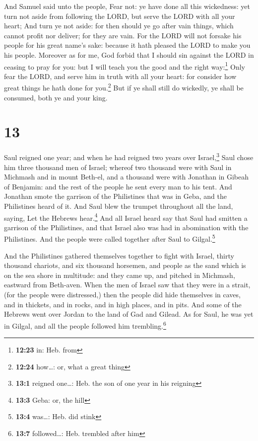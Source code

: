  And Samuel said unto the people, Fear not: ye have done
all this wickedness: yet turn not aside from following the LORD, but
serve the LORD with all your heart;  And turn ye not
aside: for then should ye go after vain things, which cannot profit nor
deliver; for they are vain.  For the LORD will not
forsake his people for his great name's sake: because it hath pleased
the LORD to make you his people.  Moreover as for me, God
forbid that I should sin against the LORD in ceasing to pray for you:
but I will teach you the good and the right way:\footnote{\textbf{12:23}
  in: Heb. from}  Only fear the LORD, and serve him in
truth with all your heart: for consider how great things he hath done
for you.\footnote{\textbf{12:24} how\ldots: or, what a great thing}
 But if ye shall still do wickedly, ye shall be consumed,
both ye and your king.

\hypertarget{section-12}{%
\section{13}\label{section-12}}

 Saul reigned one year; and when he had reigned two years
over Israel,\footnote{\textbf{13:1} reigned one\ldots: Heb. the son of
  one year in his reigning}  Saul chose him three thousand
men of Israel; whereof two thousand were with Saul in Michmash and in
mount Beth-el, and a thousand were with Jonathan in Gibeah of Benjamin:
and the rest of the people he sent every man to his tent. 
And Jonathan smote the garrison of the Philistines that was in Geba, and
the Philistines heard of it. And Saul blew the trumpet throughout all
the land, saying, Let the Hebrews hear.\footnote{\textbf{13:3} Geba: or,
  the hill}  And all Israel heard say that Saul had
smitten a garrison of the Philistines, and that Israel also was had in
abomination with the Philistines. And the people were called together
after Saul to Gilgal.\footnote{\textbf{13:4} was\ldots: Heb. did stink}

 And the Philistines gathered themselves together to fight
with Israel, thirty thousand chariots, and six thousand horsemen, and
people as the sand which is on the sea shore in multitude: and they came
up, and pitched in Michmash, eastward from Beth-aven. 
When the men of Israel saw that they were in a strait, (for the people
were distressed,) then the people did hide themselves in caves, and in
thickets, and in rocks, and in high places, and in pits. 
And some of the Hebrews went over Jordan to the land of Gad and Gilead.
As for Saul, he was yet in Gilgal, and all the people followed him
trembling.\footnote{\textbf{13:7} followed\ldots: Heb. trembled after
  him}

